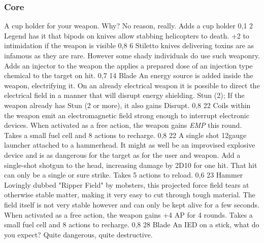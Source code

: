 \subsubsection{Core}
\vspace{8mm}
\begin{multicols}{2}
    {A cup holder for your weapon.
        Why? No reason, really.}
    {Adds a cup holder}
    {0,1}
    {2}
    {}
    {Legend has it that bipods on knives allow stabbing helicopters to death.}
    {+2 to intimidation if the weapon is visible}
    {0,8}
    {6}
    {}
    {Stiletto knives delivering toxins are as infamous as they are rare.
        However some shady individuals do use such weaponry.}
    {Adds an injector to the weapon the applies a prepared dose of
        an injection type chemical to the target on hit.}
    {0,7}
    {14}
    {Blade}
    {An energy source is added inside the weapon, electrifying it.
        On an already electrical weapon it is possible to direct the electrical field in a manner
        that will disrupt energy shielding.}
    {Stun (2); If the weapon already has Stun (2 or more), it also gains Disrupt.}
    {0,8}
    {22}
    {}
    {Coils within the weapon emit an electromagnetic field strong enough to interrupt electronic devices.}
    {When activated as a free action,
        the weapon gains \emph{EMP} this round.
        Takes a small fuel cell and 8 actions to recharge.}
    {0,8}
    {22}
    {}
    {A single shot 12gauge launcher attached to a hammerhead.
        It might as well be an improvised explosive device
        and is as dangerous for the target as for the user and weapon.}
    {Add a single-shot shotgun to the head,
        increasing damage by 2D10 for one hit.
        That hit can only be a single or sure strike.
        Takes 5 actions to reload.}
    {0,6}
    {23}
    {Hammer}
    {Lovingly dubbed "Ripper Field" by mobsters,
        this projected force field tears at otherwise stable matter,
        making it very easy to cut through tough material.
        The field itself is not very stable however
        and can only be kept alive for a few seconds.}
    {When activated as a free action,
        the weapon gains +4 AP for 4 rounds.
        Takes a small fuel cell and 8 actions to recharge.}
    {0,8}
    {28}
    {Blade}
    {An IED on a stick, what do you expect?
        Quite dangerous, quite destructive.}

\end{multicols}
